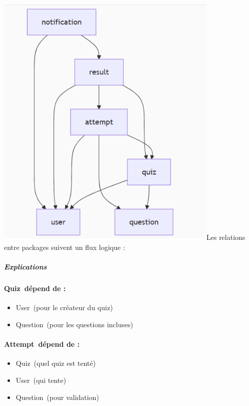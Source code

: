 \documentclass[12pt,a4paper,twoside]{report}
\begin{document}
\includegraphics[width=4.20833in,height=4.90069in]{latex_media/media/image18.png}Les
relations entre packages suivent un flux logique :

\hypertarget{explications}{%
\subparagraph{Explications~}\label{explications}}

\hypertarget{quiz-duxe9pend-de}{%
\paragraph{Quiz~dépend de :}\label{quiz-duxe9pend-de}}

\begin{itemize}
\item
  User~(pour le créateur du quiz)
\item
  Question~(pour les questions incluses)
\end{itemize}

\hypertarget{attempt-duxe9pend-de}{%
\paragraph{Attempt~dépend de :}\label{attempt-duxe9pend-de}}

\begin{itemize}
\item
  Quiz~(quel quiz est tenté)
\item
  User~(qui tente)
\item
  Question~(pour validation)
\end{itemize}
\end{document}
